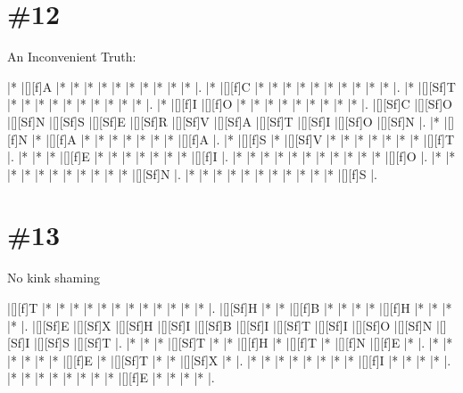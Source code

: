 \documentclass[letterpaper]{article}
\begin{document}
\section*{\#12}

An Inconvenient Truth:
\vspace*{1em}
\begin{Puzzle}{12}{11}
|*        |[][f]A   |*        |*        |*        |*        |*        |*        |*        |*        |*        |*        |. 
|*        |[][f]C   |*        |*        |*        |*        |*        |*        |*        |*        |*        |*        |.  
|*        |[][Sf]T  |*        |*        |*        |*        |*        |*        |*        |*        |*        |*        |.
|*        |[][f]I   |[][f]O   |*        |*        |*        |*        |*        |*        |*        |*        |*        |.  
|[][Sf]C  |[][Sf]O  |[][Sf]N  |[][Sf]S  |[][Sf]E  |[][Sf]R  |[][Sf]V  |[][Sf]A  |[][Sf]T  |[][Sf]I  |[][Sf]O  |[][Sf]N  |.
|*        |[][f]N   |*        |[][f]A   |*        |*        |*        |*        |*        |*        |*        |[][f]A   |. 
|*        |[][f]S   |*        |[][Sf]V  |*        |*        |*        |*        |*        |*        |*        |[][f]T   |.
|*        |*        |*        |[][f]E   |*        |*        |*        |*        |*        |*        |*        |[][f]I   |.
|*        |*        |*        |*        |*        |*        |*        |*        |*        |*        |*        |[][f]O   |.
|*        |*        |*        |*        |*        |*        |*        |*        |*        |*        |*        |[][Sf]N  |.
|*        |*        |*        |*        |*        |*        |*        |*        |*        |*        |*        |[][f]S   |.
\end{Puzzle}

\section*{\#13}
No kink shaming

\vspace*{1em}
\begin{Puzzle}{13}{7}
|[][f]T   |*        |*        |*        |*        |*        |*        |*        |*        |*        |*        |*        |*        |.
|[][Sf]H  |*        |*        |[][f]B   |*        |*        |*        |*        |[][f]H   |*        |*        |*        |*        |.
|[][Sf]E  |[][Sf]X  |[][Sf]H  |[][Sf]I  |[][Sf]B  |[][Sf]I  |[][Sf]T  |[][Sf]I  |[][Sf]O  |[][Sf]N  |[][Sf]I  |[][Sf]S  |[][Sf]T  |.
|*        |*        |*        |[][Sf]T  |*        |*        |[][f]H   |*        |[][f]T   |*        |[][f]N   |[][f]E   |*        |.
|*        |*        |*        |*        |*        |*        |[][f]E   |*        |[][Sf]T  |*        |*        |[][Sf]X  |*        |.
|*        |*        |*        |*        |*        |*        |*        |*        |[][f]I   |*        |*        |*        |*        |.
|*        |*        |*        |*        |*        |*        |*        |*        |[][f]E   |*        |*        |*        |*        |.
\end{Puzzle}
\end{document}
